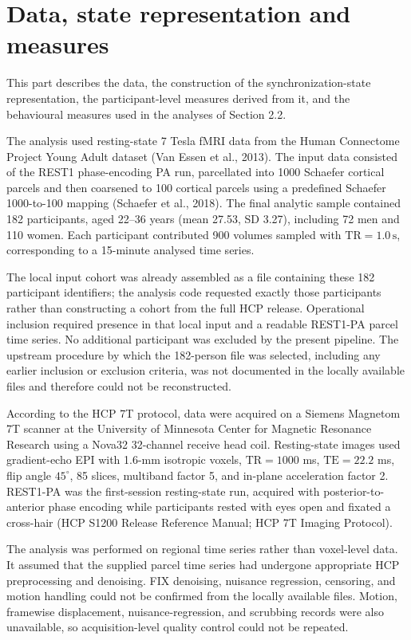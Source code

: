 \documentclass[12pt,a4paper]{report}
\begin{document}
\section{Data, state representation and measures}
This part describes the data, the construction of the synchronization-state representation, the participant-level measures derived from it, and the behavioural measures used in the analyses of Section 2.2.

The analysis used resting-state 7 Tesla fMRI data from the Human Connectome Project Young Adult dataset (Van Essen et al., 2013). The input data consisted of the REST1 phase-encoding PA run, parcellated into 1000 Schaefer cortical parcels and then coarsened to 100 cortical parcels using a predefined Schaefer 1000-to-100 mapping (Schaefer et al., 2018). The final analytic sample contained 182 participants, aged 22--36 years (mean 27.53, SD 3.27), including 72 men and 110 women. Each participant contributed 900 volumes sampled with $\mathrm{TR}=1.0\,\mathrm{s}$, corresponding to a 15-minute analysed time series.

The local input cohort was already assembled as a file containing these 182 participant identifiers; the analysis code requested exactly those participants rather than constructing a cohort from the full HCP release. Operational inclusion required presence in that local input and a readable REST1-PA parcel time series. No additional participant was excluded by the present pipeline. The upstream procedure by which the 182-person file was selected, including any earlier inclusion or exclusion criteria, was not documented in the locally available files and therefore could not be reconstructed.

According to the HCP 7T protocol, data were acquired on a Siemens Magnetom 7T scanner at the University of Minnesota Center for Magnetic Resonance Research using a Nova32 32-channel receive head coil. Resting-state images used gradient-echo EPI with 1.6-mm isotropic voxels, $\mathrm{TR}=1000$ ms, $\mathrm{TE}=22.2$ ms, flip angle $45^\circ$, 85 slices, multiband factor 5, and in-plane acceleration factor 2. REST1-PA was the first-session resting-state run, acquired with posterior-to-anterior phase encoding while participants rested with eyes open and fixated a cross-hair (HCP S1200 Release Reference Manual; HCP 7T Imaging Protocol).

The analysis was performed on regional time series rather than voxel-level data. It assumed that the supplied parcel time series had undergone appropriate HCP preprocessing and denoising. FIX denoising, nuisance regression, censoring, and motion handling could not be confirmed from the locally available files. Motion, framewise displacement, nuisance-regression, and scrubbing records were also unavailable, so acquisition-level quality control could not be repeated.
\end{document}
